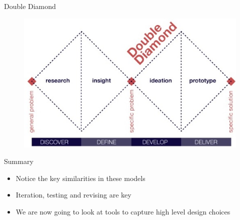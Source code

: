 
\begin{frame}{Double Diamond}
	\begin{figure}
		\includegraphics[width=1.0\textwidth, height=0.7\textheight]{double_diamond}
		\label{fig:double_diamond}
	\end{figure}
\end{frame}


\begin{frame}{Summary}
\begin{itemize}
	\item Notice the key similarities in these models
	\item Iteration, testing and revising are key
	\item We are now going to look at tools to capture high level design choices
\end{itemize}
\end{frame}